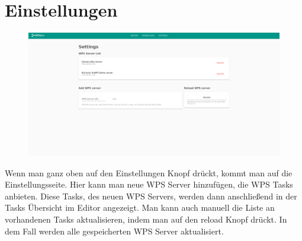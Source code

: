 \chapter{Einstellungen}
    \begin{figure}[H]
        \centering
        \includegraphics[width=15.5cm]{images/Settings.png}
        \label{settings}
    \end{figure}
    Wenn man ganz oben auf den Einstellungen Knopf drückt, kommt man auf die Einstellungsseite. Hier kann man neue WPS Server hinzufügen, die WPS Tasks anbieten. Diese Tasks, des neuen WPS Servers, werden dann anschließend in der Tasks Übersicht im Editor angezeigt. Man kann auch manuell die Liste an vorhandenen Tasks aktualisieren, indem man auf den reload Knopf drückt. In dem Fall werden alle gespeicherten WPS Server aktualisiert. 